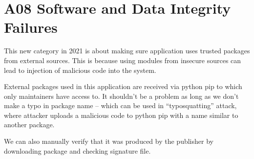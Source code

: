 \section{A08 Software and Data Integrity Failures}

This new category in 2021 is about making sure application uses trusted packages from external sources. This is because using modules from insecure sources can lead to injection of malicious code into the system.

External packages used in this application are received via python pip to which only maintainers have access to. It shouldn’t be a problem as long as we don’t make a typo in package name – which can be used in “typosquatting” attack, where attacker uploads a malicious code to python pip with a name similar to another package.

We can also manually verify that it was produced by the publisher by downloading package and checking signature file.
